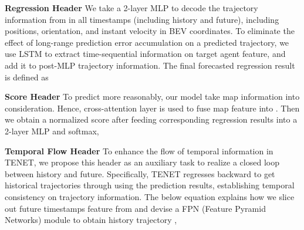 \documentclass[10pt,twocolumn,letterpaper]{article}
\begin{document}
\noindent\textbf{Regression Header} We take a 2-layer MLP to decode the trajectory information from  in all timestamps (including history and future), including positions, orientation, and instant velocity in BEV coordinates. To eliminate the effect of long-range prediction error accumulation on a predicted trajectory,  we use LSTM \cite{hochreiter1997long} to extract time-sequential information on target agent feature, and add it to post-MLP trajectory information. The final forecasted regression result is defined as
\begin{center}
    
\end{center}

\noindent\textbf{Score Header} To predict more reasonably, our model take map information into consideration. Hence, cross-attention layer is used to fuse map feature into . Then we obtain a normalized score after feeding corresponding regression results into a 2-layer MLP and softmax,
\begin{center}
    
\end{center}

\noindent\textbf{Temporal Flow Header} To enhance the flow of temporal information in TENET, we propose this header as an auxiliary task to realize a closed loop between history and future. Specifically, TENET regresses backward to get historical trajectories through using the prediction results, establishing temporal consistency on trajectory information. The below equation explains how we slice out future timestamps feature  from  and devise a FPN (Feature Pyramid Networks) \cite{lin2017feature} module to obtain history trajectory ,
\begin{center}
    
\end{center}
\end{document}
